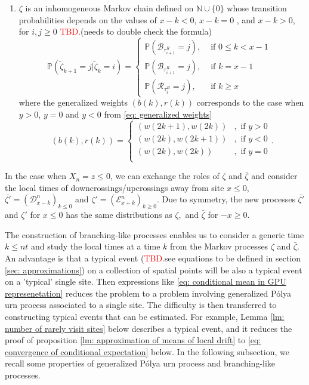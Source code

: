 \documentclass[twoside,12pt,a4paper]{article}
\numberwithin{equation}{section}
\newcommand\TBD{\textcolor{red}{TBD.}}
\begin{document}
{\begin{enumerate}
			\item  $\zeta$ is an inhomogeneous Markov chain defined on  $\mathbb{N}\cup\{0\}$ whose transition probabilities depends on the values of $x-k<0$, $x-k = 0$ , and $x-k >0$, for $i,j\geq 0$
			\TBD(needs to double check the formula)
			\begin{equation}\label{eq: transition prob on positive }
				\mathbb{P}\left(\tilde{\zeta}_{k+1}=j \vert \tilde{\zeta}_k =i  \right) = 
				\begin{cases}
					\mathbb{P}\left( \mathcal{B}_{\tau_{i+1}^R} = j \right) ,& \mbox{ if $0 \leq k <  x-1$ }
					\\
					\mathbb{P}\left( \mathcal{B}_{\tau_{i+1}^R} = j \right) ,& \mbox{ if  $k =  x-1$ }
					\\
					\mathbb{P}\left( \mathcal{R}_{\tau_i^B} = j \right) ,& \mbox{ if $k \geq x$ }
				\end{cases}
			\end{equation} where the generalized weights $(b(k), r(k))$ corresponds to the case when $y>0$, $y=0$ and $y<0$ from \eqref{eq: generalized weights}
			$$
			(b(k), r(k)) = \begin{cases}
				(w(2k+1), w(2k)) &,  \text{ if }  y>0 \\
				(w(2k), w(2k+1)) &,  \text{ if }  y<0 \\  
				(w(2k), w(2k)) &,  \text{ if }  y=0 \\ 
			\end{cases}.
			$$	 
		\end{enumerate}
		In the case when $X_n = z\leq 0$, we can exchange the roles of $\zeta$ and $\bar{\zeta}$ and consider the local times of downcrossings/upcrossings away from site $x\leq 0$,  $\bar{\zeta'}= (\mathcal{D}^{n}_{x-k} )_{k\leq 0}$ and $\zeta'= (\mathcal{E}^{n}_{x+k} )_{k\geq 0}$. Due to symmetry, the new processes $\bar{\zeta'}$ and $\zeta'$ for $x\leq 0$ has the same distributions as $\zeta,$ and $\bar{\zeta}$ for $-x\geq0$.
		
		The construction of branching-like processes enables us to consider a generic time $k\leq nt$ and study the local times at a time $k$ from the Markov processes $\zeta$ and $\bar{\zeta}$. An advantage is that a typical event (\TBD{see equations to be defined in section \ref{sec: approximations}}) on a collection of spatial points will be also a typical event on a 'typical' single site. Then expressions like \eqref{eq: conditional mean in GPU represenetation} reduces the problem to a problem involving generalized P\'{o}lya urn process associated to a single site. The difficulty is then transferred to constructing typical events that can be estimated. For example, Lemma \ref{lm: number of rarely visit sites} below describes a typical event, and it reduces the proof of proposition \ref{lm: approximation of means of local drift} to \eqref{eq: convergence of conditional expectation} below. In the following subsection, we recall some properties of generalized P\'{o}lya urn process and branching-like processes.
		
}
\end{document}
